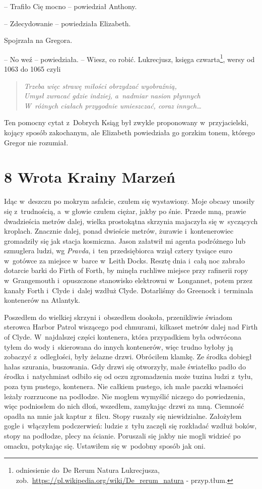 \documentclass[oneside,polish,12pt,sfheadings]{mwbk}
\begin{document}
-- Trafiło Cię mocno -- powiedział Anthony.

-- Zdecydowanie -- powiedziała Elizabeth. 

Spojrzała na Gregora. 

-- No weź -- powiedziała. -- Wiesz, co robić. Lukrecjusz, księga czwarta\footnote{odniesienie do~De Rerum Natura
Lukrecjusza, zob.~\url{https://pl.wikipedia.org/wiki/De_rerum_natura} - przyp.tłum.}, wersy od 1063 do 1065 czyli

\begin{verse} \itshape
Trzeba więc strawę miłości obrzydzać wyobraźnią,\\
Umysł zwracać gdzie indziej, a~nadmiar nasion płynnych\\ 
W~różnych ciałach przygodnie umieszczać, coraz innych\ldots \\
\end{verse}


Ten pomocny cytat z~Dobrych Ksiąg był zwykle proponowany w~przyjacielski, kojący sposób zakochanym, ale Elizabeth powiedziała go
gorzkim tonem, którego Gregor nie rozumiał.



\chapter[Wrota Krainy Marzeń]{8 Wrota Krainy Marzeń}


Idąc w~deszczu po mokrym asfalcie, czułem się wystawiony. Moje obcasy
unosiły się z~trudnością, a~w głowie czułem ciężar, jakby po śnie.
Przede mną, prawie dwadzieścia metrów dalej, wielka prostokątna skrzynia
majaczyła się w~syczących kroplach. Znacznie dalej, ponad dwieście
metrów, żurawie i~kontenerowiec gromadziły się jak stacja kosmiczna.
Jason załatwił mi agenta podróżnego lub szmuglera ludzi, wg
\emph{Pravda}, i~ten przedsiębiorca wziął cztery tysiące euro w~gotówce
za miejsce w~barce w~Leith Docks. Resztę dnia i~całą noc zabrało
dotarcie barki do Firth of Forth, by minęła ruchliwe miejsce przy
rafinerii ropy w~Grangemouth i~opuszczone stanowisko elektrowni w~Longannet, potem przez kanały Forth i~Clyde i~dalej wzdłuż Clyde.
Dotarliśmy do Greenock i~terminala kontenerów na Atlantyk.

Poszedłem do wielkiej skrzyni i~obszedłem dookoła, przenikliwie świadom
sterowca Harbor Patrol wiszącego pod chmurami, kilkaset metrów dalej nad
Firth of Clyde. W~najdalszej części kontenera, która przypadkiem była
odwrócona tyłem do wody i~skierowana do innych kontenerów, więc trudno
byłoby ją zobaczyć z~odległości, były żelazne drzwi. Obróciłem klamkę.
Ze środka dobiegł hałas szurania, buszowania. Gdy drzwi się otworzyły,
małe światełko padło do środka i~natychmiast odbiło się od oczu
zgromadzenia może tuzina ludzi z~tyłu, poza tym pustego, kontenera. Nie
całkiem pustego, ich małe paczki własności leżały rozrzucone na
podłodze. Nie mogłem wymyślić niczego do powiedzenia, więc podniosłem do
nich dłoń, wszedłem, zamykając drzwi za mną. Ciemność opadła na mnie jak
kaptur z~filcu. Stopy ruszały się niewidzialne. Założyłem gogle i~włączyłem podczerwień: ludzie z~tyłu zaczęli się rozkładać wzdłuż boków,
stopy na podłodze, plecy na ścianie. Poruszali się jakby nie mogli
widzieć po omacku, potykając się. Ustawiłem się w~podobny sposób jak
oni.
\end{document}
